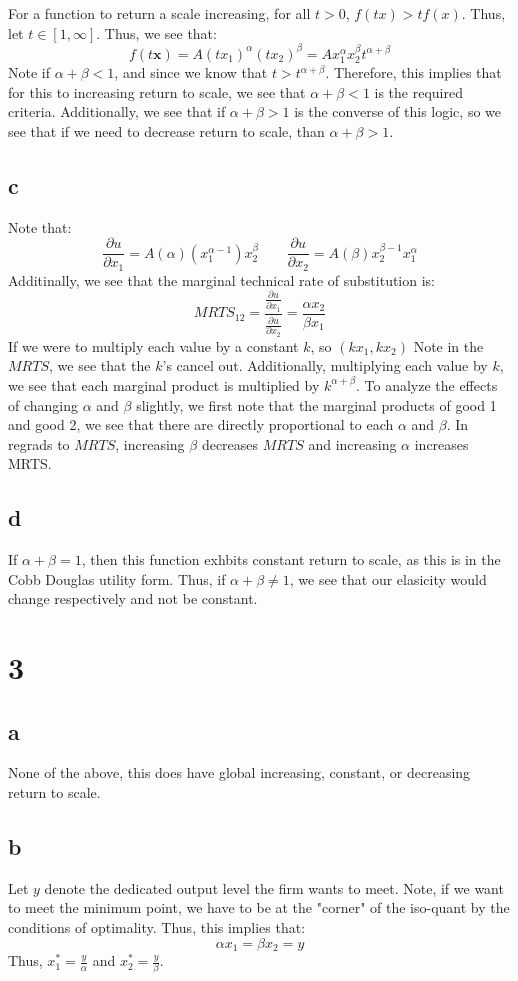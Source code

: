 \documentclass[11pt]{article}
\begin{document}
For a function to return a scale increasing, for all $t >0$, $f(tx) > tf(x)$. Thus, let $t \in [1,\infty]$. Thus, we see that:
\[
f(t\mathbf{x}) = A(tx_1)^\alpha(tx_2)^\beta = Ax_1^\alpha x_2^\beta t^{\alpha + \beta} 
\]
Note if $\alpha + \beta < 1$, and since we know that $t > t^{\alpha + \beta}$. Therefore, this implies that for this to increasing return to scale, we see that $\alpha + \beta < 1$ is the required criteria. Additionally, we see that if $\alpha + \beta > 1$ is the converse of this logic, so we see that if we need to decrease return to scale, than $\alpha + \beta >1$. 
\subsection*{c}
Note that:
\[
\frac{\partial u}{\partial x_1} = A(\alpha)(x^{\alpha -1}_1)x_2^\beta \quad \quad \frac{\partial u}{\partial x_2} = A(\beta)x^{\beta -1}_2 x_1^\alpha
\]
Additinally, we see that the marginal technical rate of substitution is:
\[
MRTS_{12} = \frac{\frac{\partial u}{\partial x_1}}{\frac{\partial u}{\partial x_2}} = \frac{\alpha x_2}{\beta x_1}
\]
If we were to multiply each value by a constant $k$, so $(kx_1, kx_2)$ Note in the $MRTS$, we see that the $k$'s cancel out. Additionally, multiplying each value by $k$, we see that each marginal product is multiplied by $k^{\alpha + \beta}$. To analyze the effects of changing $\alpha$ and $\beta$ slightly, we first note that the marginal products of good 1 and good 2, we see that there are directly proportional to each $\alpha$ and $\beta$. In regrads to $MRTS$, increasing $\beta$ decreases $MRTS$ and increasing $\alpha$ increases MRTS. 
\subsection*{d}
If $\alpha + \beta = 1$, then this function exhbits constant return to scale, as this is in the Cobb Douglas utility form. Thus, if $\alpha + \beta \neq 1$, we see that our elasicity would change respectively and not be constant. 
\section*{3}
\subsection*{a}
None of the above, this does have global increasing, constant, or decreasing return to scale. 
\subsection*{b}
Let $y$ denote the dedicated output level the firm wants to meet. Note, if we want to meet the minimum point, we have to be at the "corner" of the iso-quant by the conditions of optimality. Thus, this implies that:
\[
\alpha x_1 = \beta x_2 = y
\]
Thus, $x_1^* = \frac{y}{\alpha}$ and $x_2^* = \frac{y}{\beta}$. 
\end{document}
